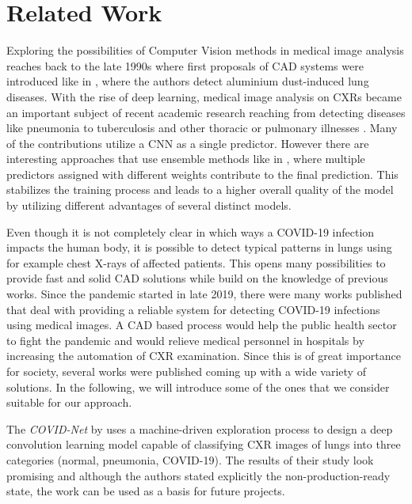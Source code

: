 \section{Related Work}
Exploring the possibilities of Computer Vision methods in medical image analysis reaches back to the late 1990s where first proposals of \ac{CAD} systems were introduced like in \autocite{kraus2000aluminium}, where the authors detect aluminium dust-induced lung diseases.
With the rise of deep learning, medical image analysis on \acp{CXR} became an important subject of recent academic research reaching from detecting diseases like pneumonia \autocite{pneumoniaDetection, pneumoniaDetection2, gupta2019evolutionary} to tuberculosis and other thoracic or pulmonary illnesses \autocite{jangam2021deep, vieira2021detecting}. Many of the contributions utilize a \ac{CNN} as a single predictor. However there are interesting approaches that use ensemble methods like in \autocite{livieris2019weighted}, where multiple predictors assigned with different weights contribute to the final prediction. This stabilizes the training process and leads to a higher overall quality of the model by utilizing different advantages of several distinct models.

Even though it is not completely clear in which ways a COVID-19 infection impacts the human body, it is possible to detect typical patterns in lungs using for example chest X-rays of affected patients. This opens many possibilities to provide fast and solid \ac{CAD} solutions while build on the knowledge of previous works.
Since the pandemic started in late 2019, there were many works published that deal with providing a reliable system for detecting COVID-19 infections using medical images. A \ac{CAD} based process would help the public health sector to fight the pandemic and would relieve medical personnel in hospitals by increasing the automation of \ac{CXR} examination. Since this is of great importance for society, several works were published coming up with a wide variety of solutions. In the following, we will introduce some of the ones that we consider suitable for our approach.

The \textit{COVID-Net} \autocite{wang2020covid} by \citeauthor{wang2020covid} uses a machine-driven exploration process to design a deep convolution learning model capable of classifying \ac{CXR} images of lungs into three categories (normal, pneumonia, COVID-19). The results of their study look promising and although the authors stated explicitly the non-production-ready state, the work can be used as a basis for future projects.


